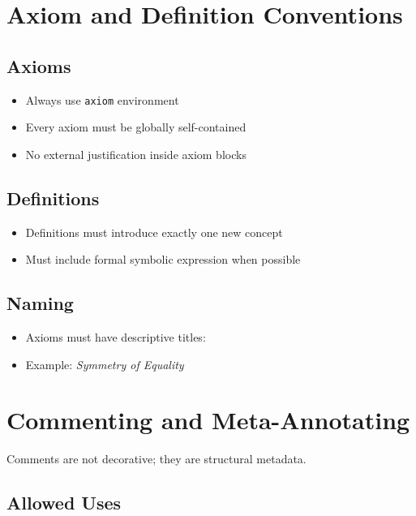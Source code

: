 \documentclass{book}
\begin{document}
\section{Axiom and Definition Conventions}

\subsection{Axioms}

\begin{itemize}
    \item Always use \texttt{axiom} environment
    \item Every axiom must be globally self-contained
    \item No external justification inside axiom blocks
\end{itemize}

\subsection{Definitions}

\begin{itemize}
    \item Definitions must introduce exactly one new concept
    \item Must include formal symbolic expression when possible
\end{itemize}

\subsection{Naming}

\begin{itemize}
    \item Axioms must have descriptive titles:
    \item Example: \textit{Symmetry of Equality}
\end{itemize}

\section{Commenting and Meta-Annotating}

Comments are not decorative; they are structural metadata.

\subsection{Allowed Uses}
\end{document}
